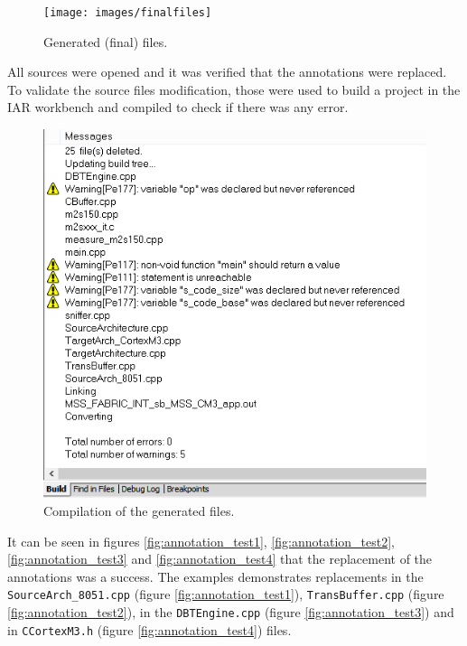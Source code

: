 \begin{figure}[H]
\centerline{
\texttt{[image: images/finalfiles]}
}
\caption{Generated (final) files.}
\label{fig:final_files}
\end{figure}

All sources were opened and it was verified that the annotations were replaced. To validate the source files modification, those were used to build a project in the IAR workbench and compiled to check if there was any error.

\begin{figure}[H]
\centerline{
\includegraphics[scale=0.5]{images/compilar}
}
\caption{Compilation of the generated files.}
\label{fig:final_files2}
\end{figure}

It can be seen in figures \ref{fig:annotation_test1}, \ref{fig:annotation_test2}, \ref{fig:annotation_test3} and \ref{fig:annotation_test4} that the replacement of the annotations was  a success. The examples demonstrates replacements in the \texttt{SourceArch\_8051.cpp} (figure \ref{fig:annotation_test1}), \texttt{TransBuffer.cpp} (figure \ref{fig:annotation_test2}), in the \texttt{DBTEngine.cpp} (figure \ref{fig:annotation_test3}) and in \texttt{CCortexM3.h} (figure \ref{fig:annotation_test4}) files.

